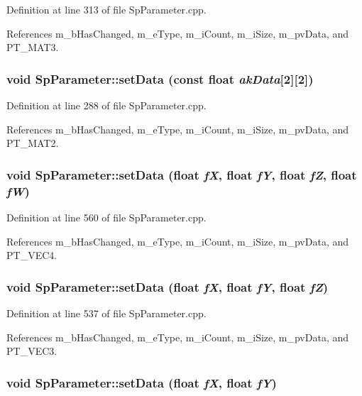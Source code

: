 Definition at line 313 of file Sp\-Parameter.cpp.

References m\_\-b\-Has\-Changed, m\_\-e\-Type, m\_\-i\-Count, m\_\-i\-Size, m\_\-pv\-Data, and PT\_\-MAT3.
\subsubsection{\setlength{\rightskip}{0pt plus 5cm}void Sp\-Parameter::set\-Data (const float {\em ak\-Data}[2][2])}\label{classSpark_1_1SpParameter_a33}


Definition at line 288 of file Sp\-Parameter.cpp.

References m\_\-b\-Has\-Changed, m\_\-e\-Type, m\_\-i\-Count, m\_\-i\-Size, m\_\-pv\-Data, and PT\_\-MAT2.
\subsubsection{\setlength{\rightskip}{0pt plus 5cm}void Sp\-Parameter::set\-Data (float {\em f\-X}, float {\em f\-Y}, float {\em f\-Z}, float {\em f\-W})}\label{classSpark_1_1SpParameter_a32}


Definition at line 560 of file Sp\-Parameter.cpp.

References m\_\-b\-Has\-Changed, m\_\-e\-Type, m\_\-i\-Count, m\_\-i\-Size, m\_\-pv\-Data, and PT\_\-VEC4.
\subsubsection{\setlength{\rightskip}{0pt plus 5cm}void Sp\-Parameter::set\-Data (float {\em f\-X}, float {\em f\-Y}, float {\em f\-Z})}\label{classSpark_1_1SpParameter_a31}


Definition at line 537 of file Sp\-Parameter.cpp.

References m\_\-b\-Has\-Changed, m\_\-e\-Type, m\_\-i\-Count, m\_\-i\-Size, m\_\-pv\-Data, and PT\_\-VEC3.
\subsubsection{\setlength{\rightskip}{0pt plus 5cm}void Sp\-Parameter::set\-Data (float {\em f\-X}, float {\em f\-Y})}\label{classSpark_1_1SpParameter_a30}


